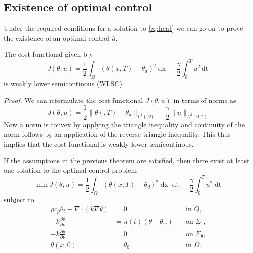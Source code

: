 \subsection{Existence of optimal control}
Under the required conditions for a solution to \eqref{eq:heat} we can go on to prove the existence of an optimal control $\bar{u}$. 

\begin{lemma}[WLSC]
    The cost functional given b y
    \begin{equation*}
         J(\theta, u) = \frac{1}{2} \int_\Omega (\theta(x, T) - \theta_d)^2 \mathop{dx} + \frac{\gamma}{2} \int_0^{T} u^2 \mathop{dt}
    \end{equation*}
    is weakly lower semicontinous (WLSC). 
\end{lemma}

\begin{proof}
We can reformulate the cost functional $J(\theta, u)$ in terms of norms as 
\begin{equation*}
    J(\theta, u) = \frac{1}{2}\|\theta (,T) - \theta_d \|_{L^2(\Omega)} + \frac{\gamma}{2}\|u\|_{L^2(0,T)}
\end{equation*}
Now a norm is convex by applying the triangle inequality and continuity of the norm follows by an application of the reverse triangle inequality. This thus implies that the cost functional is weakly lower semicontinous. 
\end{proof}

\begin{theorem}
If the assumptions in the previous theorem are satisfied, then there exist at least one solution to the optimal control problem 
\begin{equation*}
       \min J(\theta, u) = \frac{1}{2} \int_\Omega (\theta(x, T) - \theta_d)^2 \mathop{dx} \mathop{dt} + \frac{\gamma}{2} \int_0^{T} u^2 \mathop{dt}
\end{equation*}
subject to
\begin{align*}
       \rho c_p \theta_t - \nabla \cdot (k \nabla \theta) &= 0 \quad &\text{in } Q,  \\
      -k \frac{\partial \theta}{\partial \nu} &= u(t) (\theta - \theta_w) \quad &\text{on } \Sigma_1, \\
      -k \frac{\partial \theta}{\partial \nu} &= 0 \quad &\text{on } \Sigma_0, \\
      \theta(x, 0) &= \theta_0 & \text{in $\Omega$.}
\end{align*}
\end{theorem}

